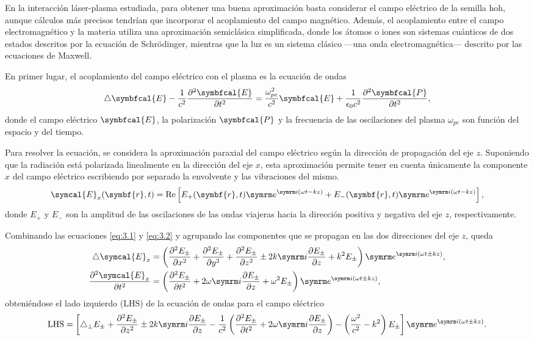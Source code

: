 En la interacción láser-plasma estudiada, para obtener una buena aproximación basta considerar el campo eléctrico de la semilla \acrshort{hoh}, aunque cálculos más precisos tendrían que incorporar el acoplamiento del campo magnético. Además, el acoplamiento entre el campo electromagnético y la materia utiliza una aproximación semiclásica simplificada, donde los átomos o iones son sistemas cuánticos de dos estados descritos por la ecuación de Schrödinger, mientras que la luz es un sistema clásico ---una onda electromagnética--- descrito por las ecuaciones de Maxwell.

En primer lugar, el acoplamiento del campo eléctrico con el plasma es la ecuación de ondas 
\begin{equation}\label{eq:3.1}
  \laplacian \symbfcal{E} - \frac{1}{c^{2}}\pdvN{\symbfcal{E}}{t}{2} = \frac{\omega^{2}_{pe}}{c^{2}}\symbfcal{E} + \frac{1}{\epsilon_{0}c^{2}}\pdvN{\symbfcal{P}}{t}{2},
\end{equation}
\noindent
donde el campo eléctrico $\symbfcal{E}$, la polarización $\symbfcal{P}$ y la frecuencia de las oscilaciones del plasma $\omega_{pe}$ son función del espacio y del tiempo.

Para resolver la ecuación, se considera la aproximación paraxial del campo eléctrico según la dirección de propagación del eje $z$. Suponiendo que la radiación está polarizada linealmente en la dirección del eje $x$, esta aproximación permite tener en cuenta únicamente la componente $x$ del campo eléctrico escribiendo por separado la envolvente y las vibraciones del mismo.
\begin{equation}\label{eq:3.2}
  \symcal{E}_{x}(\symbf{r},t) = \RE \left[E_{+}(\symbf{r},t)\eu^{\iu (\omega t - kz)} + E_{-}(\symbf{r},t)\eu^{\iu (\omega t - kz)}\right],
\end{equation}
\noindent
donde $E_{+}$ y $E_{-}$ son la amplitud de las oscilaciones de las ondas viajeras hacia la dirección positiva y negativa del eje $z$, respectivamente. 

Combinando las ecuaciones \eqref{eq:3.1} y \eqref{eq:3.2} y agrupando las componentes que se propagan en las dos direcciones del eje $z$, queda 
\begin{align}
  \laplacian \symcal{E}_{x} 
  &= 
  \left(\pdvN{E_{\pm }}{x}{2} + \pdvN{E_{\pm }}{y}{2} + \pdvN{E_{\pm }}{z}{2} \pm 2k \iu \pdv{E_{\pm }}{z} + k^{2}E_{\pm }\right)\eu^{\iu (\omega t \pm kz)}, \\
  \pdvN{\symcal{E}_{x}}{t}{2}
  &= 
  \left(\pdvN{E_{\pm }}{t}{2} + 2 \omega \iu \pdv{E_{\pm }}{z} + \omega^{2}E_{\pm }\right)\eu^{\iu (\omega t \pm kz)},
\end{align}
\noindent
obteniéndose el lado izquierdo ($\mathrm{LHS}$) de la ecuación de ondas para el campo eléctrico
\begin{equation}\label{eq:3.3}
  \mathrm{LHS} = \left[\laplacian_{\perp}E_{\pm} + \pdvN{E_{\pm }}{z}{2} \pm 2k \iu \pdv{E_{\pm }}{z} - \frac{1}{c^{2}}\left(\pdvN{E_{\pm }}{t}{2} + 2 \omega \iu \pdv{E_{\pm }}{z}\right) 
  -\left(\frac{\omega^{2}}{c^{2}} - k^{2}\right)E_{\pm }\right] \eu^{\iu(\omega t \pm kz)}.
\end{equation}

